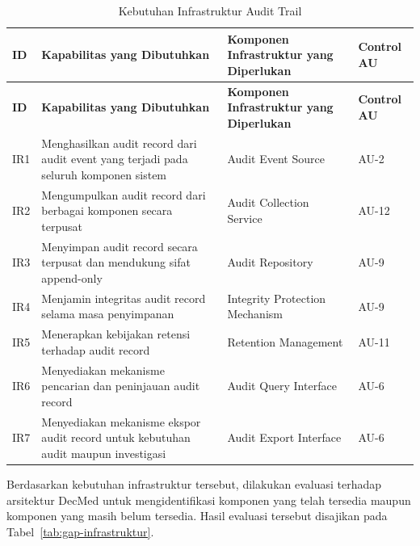 \begin{xltabular}
{\textwidth}
{|>{\centering\arraybackslash}p{1.2cm}
 |>{\raggedright\arraybackslash}p{4.5cm}
 |>{\raggedright\arraybackslash}X
 |>{\centering\arraybackslash}p{2cm}|}

\caption{Kebutuhan Infrastruktur Audit Trail}
\label{tab:audit-infrastructure-requirement}\\

\hline
\textbf{ID} &
\textbf{Kapabilitas yang Dibutuhkan} &
\textbf{Komponen Infrastruktur yang Diperlukan} &
\textbf{Control AU} \\
\hline
\endfirsthead

\hline
\textbf{ID} &
\textbf{Kapabilitas yang Dibutuhkan} &
\textbf{Komponen Infrastruktur yang Diperlukan} &
\textbf{Control AU} \\
\hline
\endhead

\hline
\endfoot

\hline
\endlastfoot

IR1 &
Menghasilkan audit record dari audit event yang terjadi pada seluruh komponen sistem &
Audit Event Source &
AU-2 \\
\hline

IR2 &
Mengumpulkan audit record dari berbagai komponen secara terpusat &
Audit Collection Service &
AU-12 \\
\hline

IR3 &
Menyimpan audit record secara terpusat dan mendukung sifat append-only &
Audit Repository &
AU-9 \\
\hline

IR4 &
Menjamin integritas audit record selama masa penyimpanan &
Integrity Protection Mechanism &
AU-9 \\
\hline

IR5 &
Menerapkan kebijakan retensi terhadap audit record &
Retention Management &
AU-11 \\
\hline

IR6 &
Menyediakan mekanisme pencarian dan peninjauan audit record &
Audit Query Interface &
AU-6 \\
\hline

IR7 &
Menyediakan mekanisme ekspor audit record untuk kebutuhan audit maupun investigasi &
Audit Export Interface &
AU-6 \\
\hline

\end{xltabular}

Berdasarkan kebutuhan infrastruktur tersebut, dilakukan evaluasi terhadap arsitektur DecMed untuk mengidentifikasi komponen yang telah tersedia maupun komponen yang masih belum tersedia. Hasil evaluasi tersebut disajikan pada Tabel~\ref{tab:gap-infrastruktur}.

